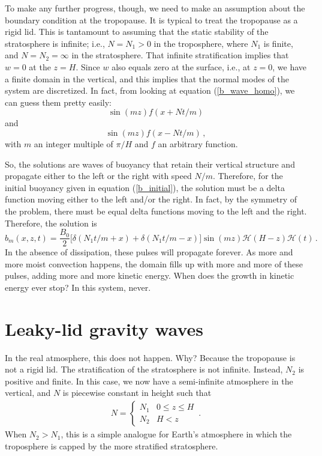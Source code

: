 \documentclass[12pt]{article}
\begin{document}
To make any further progress, though, we need to make an assumption about the boundary condition at the tropopause.  It is typical to treat the tropopause as a rigid lid.  This is tantamount to assuming that the static stability of the stratosphere is infinite; i.e., $N = N_1 > 0$ in the troposphere, where $N_1$ is finite, and $N = N_2 = \infty$ in the stratosphere.  That infinite stratification implies that $w = 0$ at the $z = H$.  Since $w$ also equals zero at the surface, i.e., at $z=0$, we have a finite domain in the vertical, and this implies that the normal modes of the system are discretized.  In fact, from looking at equation (\ref{b_wave_homo}), we can guess them pretty easily:
\[
\sin(mz) f(x + Nt/m)
\]
and
\[
\sin(mz) f(x - Nt/m) \, ,
\]
with $m$ an integer multiple of $\pi/H$ and $f$ an arbitrary function.


So, the solutions are waves of buoyancy that retain their vertical structure and propagate either to the left or the right with speed $N/m$.  Therefore, for the initial buoyancy given in equation (\ref{b_initial}), the solution must be a delta function moving either to the left and/or the right.  In fact, by the symmetry of the problem, there must be equal delta functions moving to the left and the right.  Therefore, the solution is
\begin{equation}
b_m(x,z,t) = \frac{B_0}{2} \Big[ \delta(N_1 t/m + x) + \delta(N_1 t/m - x) \Big] \sin(m z) \mathcal{H}(H-z)\mathcal{H}(t)  \, . \label{b_rigid}
\end{equation}
In the absence of dissipation, these pulses will propagate forever.  As more and more moist convection happens, the domain fills up with more and more of these pulses, adding more and more kinetic energy.  When does the growth in kinetic energy ever stop?  In this system, never.


\section{Leaky-lid gravity waves}


In the real atmosphere, this does not happen.  Why?  Because the tropopause is not a rigid lid.  The stratification of the stratosphere is not infinite.  Instead, $N_2$ is positive and finite.  In this case, we now have a semi-infinite atmosphere in the vertical, and $N$ is piecewise constant in height such that
\begin{eqnarray}
N = \begin{cases}
N_1 & 0 \le z \le H \\
N_2 &  H < z
\end{cases} \, .
\end{eqnarray}
When $N_2 > N_1$, this is a simple analogue for Earth's atmosphere in which the troposphere is capped by the more stratified stratosphere.
\end{document}
